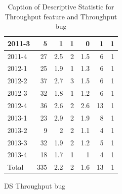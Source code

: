 \documentclass[UKenglish]{ifimaster}  %
\begin{document}
\begin{appendices}
\begin{table}[!htbp]
\begin{adjustwidth}{-1.5cm}{}
\begin{subfigure}[b]{0.3\textwidth}
{\begin{tabular}{ | l | r | r | r | r | r | r | }
 2011-3  & 5 & 1 & 1 & 0 &1 & 1 \\ \hline
 2011-4  & 27 & 2.5 & 2 & 1.5 & 6 & 1 \\ \hline
 2012-1  & 25 & 1.9 & 1 & 1.3 & 6 & 1 \\ \hline
 2012-2  & 37 & 2.7 & 3 & 1.5 & 6 & 1 \\ \hline
 2012-3  & 32 & 1.8 & 1 & 1.2 & 6 & 1 \\ \hline
 2012-4  & 36 & 2.6 & 2 & 2.6 & 13 & 1 \\ \hline
 2013-1  & 23 & 2.9 & 2 & 1.9 & 8 & 1 \\ \hline
 2013-2  & 9 & 2 & 2 & 1.1 & 4 & 1 \\ \hline
 2013-3  & 32 & 1.9 & 2 & 1.2 & 5 & 1 \\ \hline
 2013-4  & 18 & 1.7 & 1 & 1 & 4 & 1 \\ \hline
 Total  & 335 & 2.2 & 2 & 1.6 & 13 & 1 \\ \hline
\end{tabular}
}
\caption{DS Throughput bug}
 \label{DS:TPB:10}
\end{subfigure}
\end{adjustwidth}
\caption[Optional caption for list of figures]{Caption of Descriptive Statistic for Throughput feature and Throughput bug}
\label{DS:10:2}
\end{table}




\end{appendices}
\end{document}
